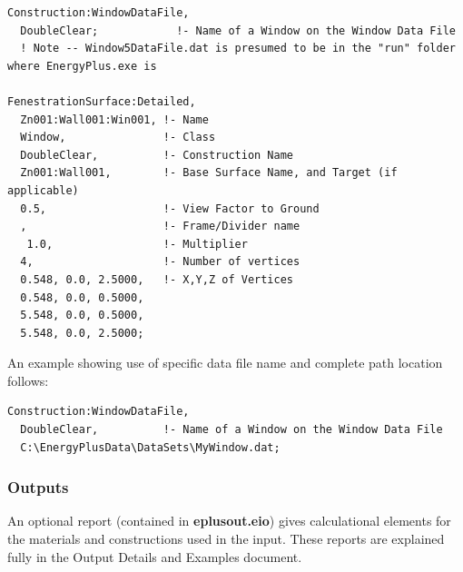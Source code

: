 \begin{lstlisting}
Construction:WindowDataFile,
  DoubleClear;            !- Name of a Window on the Window Data File
  ! Note -- Window5DataFile.dat is presumed to be in the "run" folder where EnergyPlus.exe is

FenestrationSurface:Detailed,
  Zn001:Wall001:Win001, !- Name
  Window,               !- Class
  DoubleClear,          !- Construction Name
  Zn001:Wall001,        !- Base Surface Name, and Target (if applicable)
  0.5,                  !- View Factor to Ground
  ,                     !- Frame/Divider name
   1.0,                 !- Multiplier
  4,                    !- Number of vertices
  0.548, 0.0, 2.5000,   !- X,Y,Z of Vertices
  0.548, 0.0, 0.5000,
  5.548, 0.0, 0.5000,
  5.548, 0.0, 2.5000;
\end{lstlisting}

An example showing use of specific data file name and complete path location follows:

\begin{lstlisting}
Construction:WindowDataFile,
  DoubleClear,          !- Name of a Window on the Window Data File
  C:\EnergyPlusData\DataSets\MyWindow.dat;
\end{lstlisting}

\subsubsection{Outputs}\label{outputs-4-016}

An optional report (contained in \textbf{eplusout.eio}) gives calculational elements for the materials and constructions used in the input. These reports are explained fully in the Output Details and Examples document.
